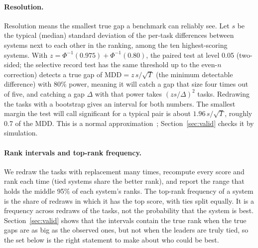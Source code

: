 \documentclass[11pt]{article}
\begin{document}
\paragraph{Resolution.}
Resolution means the smallest true gap a benchmark can reliably see.
Let $s$ be the typical (median) standard deviation of the per-task differences between systems next to each other in the ranking, among the ten highest-scoring systems.
With $z=\Phi^{-1}(0.975)+\Phi^{-1}(0.80)$, the paired test at level 0.05 (two-sided; the selective record test has the same threshold up to the even-$n$ correction) detects a true gap of $\mathrm{MDD}=z\,s/\sqrt{T}$ (the minimum detectable difference) with 80\% power, meaning it will catch a gap that size four times out of five, and catching a gap $\Delta$ with that power takes $(zs/\Delta)^2$ tasks.
Redrawing the tasks with a bootstrap gives an interval for both numbers.
The smallest margin the test will call significant for a typical pair is about $1.96\,s/\sqrt{T}$, roughly 0.7 of the MDD.
This is a normal approximation~\citep{card2020power,kotawala2026resolution}; Section~\ref{sec:valid} checks it by simulation.

\paragraph{Rank intervals and top-rank frequency.}
We redraw the tasks with replacement many times, recompute every score and rank each time (tied systems share the better rank), and report the range that holds the middle 95\% of each system's ranks.
The top-rank frequency of a system is the share of redraws in which it has the top score, with ties split equally.
It is a frequency across redraws of the tasks, not the probability that the system is best.
Section~\ref{sec:valid} shows that the intervals contain the true rank when the true gaps are as big as the observed ones, but not when the leaders are truly tied, so the set below is the right statement to make about who could be best.
\end{document}
